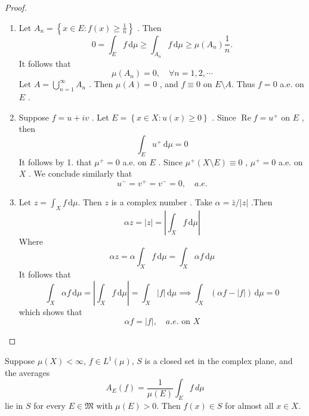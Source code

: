 \documentclass[../main.tex]{subfiles}
\begin{document}
\begin{proof}
    \begin{enumerate}
        \item Let \(  A_{n}= \left\{ x \in E: f\left( x \right)\ge \frac{1 }{n }   \right\}  \) . Then \[
       0=  \int_{E}f\,\mathrm{d} \mu \ge \int_{A_{n}}f\,\mathrm{d} \mu \ge \mu \left( A_{n} \right)\frac{1 }{n } . 
        \]  It follows that \[
        \mu \left( A_{n} \right)= 0 ,\quad \forall n = 1,2,\cdots  
        \] Let \(  A   = \bigcup _{n = 1}^{\infty}A_{n}\)  .  Then \(  \mu \left( A \right)= 0   \) , and \(  f\equiv 0  \) on \(  E\setminus A  \).  Thus \(  f= 0   \) a.e. on \(  E  \) .     
        \item Suppose \(  f = u+ iv  \) .  Let \(  E=  \left\{ x \in X : u\left( x \right)\ge 0  \right\} \) . Since \(  \operatorname{Re}f = u^{+ }  \)  on \(  E  \) ,  then  \[
        \int_{E}u^{+ }\,\mathrm{d} \mu = 0
        \]  It follows by 1. that \(  \mu ^{+ }= 0   \) a.e. on \(  E  \) .  Since \(  \mu ^{+ }\left( X\setminus E \right)\equiv 0    \) , \(  \mu ^{+ }= 0   \) a.e. on \(  X  \) . We conclude similarly that \[
        u^{-}= v^{+ }= v^{-}= 0 ,\quad a.e.
        \]    
        \item Let \(  z=  \int_{X}f\,\mathrm{d} \mu   \). Then \(  z   \) is a complex number .   Take \(  \alpha = \bar{z}/\left| z \right|   \) .Then \[
        \alpha z = \left| z \right|= \left| \int_{X}f\,\mathrm{d} \mu  \right|  
        \]  Where \[
        \alpha z= \alpha \int_{X}f\,\mathrm{d} \mu = \int_{X}\alpha f\,\mathrm{d} \mu 
        \] It follows that \[
        \int_{X}\alpha f\,\mathrm{d} \mu = \left| \int_{X}f\,\mathrm{d} \mu  \right|= \int_{X}\left| f \right|\,\mathrm{d} \mu \implies \int_{X}\left( \alpha f-\left| f \right|  \right)\,\mathrm{d} \mu = 0   
        \] which shows that \[
        \alpha f= \left| f \right|,\quad a.e. \text{ on } X  
        \]
    \end{enumerate}
    
\end{proof}

\begin{theorem}{}{}
Suppose $\mu(X) < \infty$, $f \in L^1(\mu)$, $S$ is a closed set in the complex plane, and the averages
\[
A_E(f) = \frac{1}{\mu(E)} \int_E f \, d\mu
\]
lie in $S$ for every $E \in \mathfrak{M}$ with $\mu(E) > 0$. Then $f(x) \in S$ for almost all $x \in X$.
\end{theorem}
\end{document}
